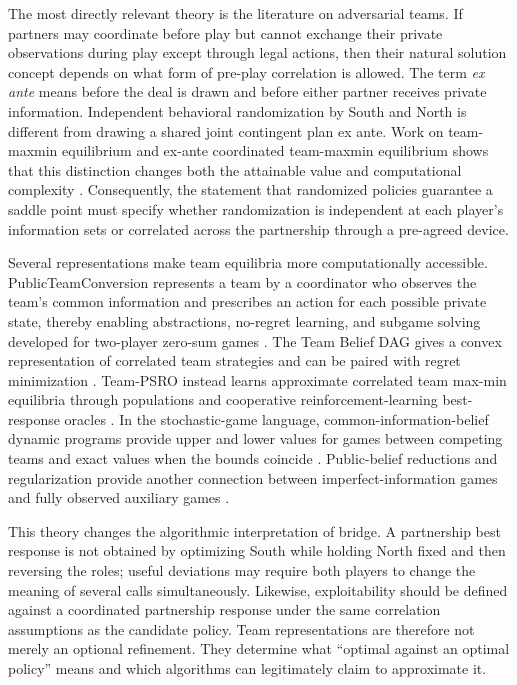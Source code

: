 \documentclass[11pt]{article}
\begin{document}
The most directly relevant theory is the literature on adversarial teams. If partners may coordinate before play but cannot exchange their private observations during play except through legal actions, then their natural solution concept depends on what form of pre-play correlation is allowed. The term \emph{ex ante} means before the deal is drawn and before either partner receives private information. Independent behavioral randomization by South and North is different from drawing a shared joint contingent plan ex ante. Work on team-maxmin equilibrium and ex-ante coordinated team-maxmin equilibrium shows that this distinction changes both the attainable value and computational complexity \cite{farina2018coordination,farina2021collusion}. Consequently, the statement that randomized policies guarantee a saddle point must specify whether randomization is independent at each player's information sets or correlated across the partnership through a pre-agreed device.

Several representations make team equilibria more computationally accessible. PublicTeamConversion represents a team by a coordinator who observes the team's common information and prescribes an action for each possible private state, thereby enabling abstractions, no-regret learning, and subgame solving developed for two-player zero-sum games \cite{carminati2022marriage}. The Team Belief DAG gives a convex representation of correlated team strategies and can be paired with regret minimization \cite{zhang2023teambelief}. Team-PSRO instead learns approximate correlated team max-min equilibria through populations and cooperative reinforcement-learning best-response oracles \cite{mcaleer2023teampsro}. In the stochastic-game language, common-information-belief dynamic programs provide upper and lower values for games between competing teams and exact values when the bounds coincide \cite{kartik2022competingteams}. Public-belief reductions and regularization provide another connection between imperfect-information games and fully observed auxiliary games \cite{sokota2023abstracting}.

This theory changes the algorithmic interpretation of bridge. A partnership best response is not obtained by optimizing South while holding North fixed and then reversing the roles; useful deviations may require both players to change the meaning of several calls simultaneously. Likewise, exploitability should be defined against a coordinated partnership response under the same correlation assumptions as the candidate policy. Team representations are therefore not merely an optional refinement. They determine what ``optimal against an optimal policy'' means and which algorithms can legitimately claim to approximate it.
\end{document}
